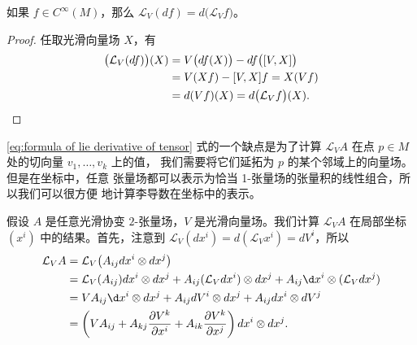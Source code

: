 \begin{corollary}
  如果 $f\in C^\infty(M)$，那么 $\mathcal L_V(df)=d\bigl(\mathcal L_Vf\bigr)$。
\end{corollary}
\begin{proof}
  任取光滑向量场 $X$，有 
  \begin{align*}
    \bigl(\mathcal L_V(df)\bigr)(X)&=V\bigl(df(X)\bigr)-df\bigl([V,X]\bigr)\\
    &=V(Xf)-[V,X]f=X(Vf)\\
    &=d(Vf)(X)=d\bigl(\mathcal L_Vf\bigr)(X).\qedhere
  \end{align*}
\end{proof}

\eqref{eq:formula of lie derivative of tensor} 式的一个缺点是为了计算
$\mathcal L_VA$ 在点 $p\in M$ 处的切向量 $v_1,\dots,v_k$ 上的值，
我们需要将它们延拓为 $p$ 的某个邻域上的向量场。但是在坐标中，任意
张量场都可以表示为恰当 1-张量场的张量积的线性组合，所以我们可以很方便
地计算李导数在坐标中的表示。

\begin{example}
  假设 $A$ 是任意光滑协变 $2$-张量场，$V$ 是光滑向量场。我们计算
  $\mathcal L_VA$ 在局部坐标 $(x^i)$ 中的结果。首先，注意到
  $\mathcal L_V(dx^i)=d(\mathcal L_Vx^i)=d V^i$，所以 
  \begin{align*}
    \mathcal L_VA&=\mathcal L_V\bigl(A_{ij}dx^i\otimes dx^j\bigr)\\
    &=\mathcal L_V (A_{ij})dx^i\otimes dx^j+A_{ij}(\mathcal L_V dx^i)\otimes
    dx^j+A_{ij} \d x^i\otimes (\mathcal L_Vdx^j)\\
    &=VA_{ij} \d x^i\otimes d x^j+A_{ij}dV^i\otimes dx^j+A_{ij}dx^i\otimes dV^j\\
    &=\left(
      VA_{ij}+A_{kj}\frac{\partial V^k}{\partial x^i}+A_{ik}
      \frac{\partial V^k}{\partial x^j}
    \right)dx^i\otimes dx^j.
  \end{align*}
\end{example}



